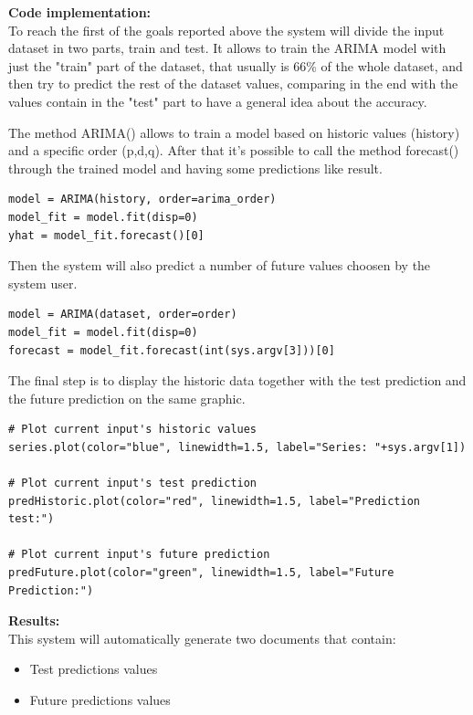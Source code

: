 \textbf{Code implementation:}\\
To reach the first of the goals reported above the system will divide the input dataset in two parts, train and test. It allows to train the ARIMA model with just the "train" part of the dataset, that usually is 66\% of the whole dataset, and then try to predict the rest of the dataset values, comparing in the end with the values contain in the "test" part to have a general idea about the accuracy.

The method ARIMA() allows to train a model based on historic values (history) and a specific order (p,d,q). After that it's possible to call the method forecast() through the trained model and having some predictions like result.

\begin{lstlisting}
model = ARIMA(history, order=arima_order)
model_fit = model.fit(disp=0)
yhat = model_fit.forecast()[0]
\end{lstlisting}

Then the system will also predict a number of future values choosen by the system user.
\begin{lstlisting}
model = ARIMA(dataset, order=order)
model_fit = model.fit(disp=0)
forecast = model_fit.forecast(int(sys.argv[3]))[0]
\end{lstlisting}

The final step is to display the historic data together with the test prediction and the future prediction on the same graphic. 
\begin{lstlisting}
# Plot current input's historic values 
series.plot(color="blue", linewidth=1.5, label="Series: "+sys.argv[1])

# Plot current input's test prediction
predHistoric.plot(color="red", linewidth=1.5, label="Prediction test:")

# Plot current input's future prediction
predFuture.plot(color="green", linewidth=1.5, label="Future Prediction:")

\end{lstlisting}

\textbf{Results:}\\
This system will automatically generate two documents that contain:
\vspace{-5mm}
\begin{itemize}
 \setlength{\itemsep}{-5pt} 
\item Test predictions values
\item Future predictions values
\end{itemize}


